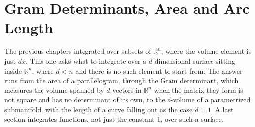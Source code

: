 \chapter{Gram Determinants, Area and Arc Length}
\label{ch:gram_determinant}

The previous chapters integrated over subsets of $\mathbb{R}^n$, where the volume element is
just $dx$. This one asks what to integrate over a $d$-dimensional surface sitting inside
$\mathbb{R}^n$, where $d < n$ and there is no such element to start from. The answer runs from
the area of a parallelogram, through the Gram determinant, which measures the volume spanned by
$d$ vectors in $\mathbb{R}^n$ when the matrix they form is not square and has no determinant of
its own, to the $d$-volume of a parametrized submanifold, with the length of a curve falling out
as the case $d = 1$. A last section integrates functions, not just the constant $1$, over such a
surface.







